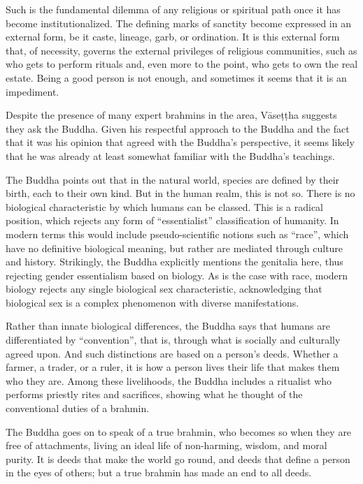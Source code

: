 \documentclass[12pt,openany]{book}%
\begin{document}
Such is the fundamental dilemma of any religious or spiritual path once it has become institutionalized. The defining marks of sanctity become expressed in an external form, be it caste, lineage, garb, or ordination. It is this external form that, of necessity, governs the external privileges of religious communities, such as who gets to perform rituals and, even more to the point, who gets to own the real estate. Being a good person is not enough, and sometimes it seems that it is an impediment.

Despite the presence of many expert brahmins in the area, \textsanskrit{Vāseṭṭha} suggests they ask the Buddha. Given his respectful approach to the Buddha and the fact that it was his opinion that agreed with the Buddha’s perspective, it seems likely that he was already at least somewhat familiar with the Buddha’s teachings.

The Buddha points out that in the natural world, species are defined by their birth, each to their own kind. But in the human realm, this is not so. There is no biological characteristic by which humans can be classed. This is a radical position, which rejects any form of “essentialist” classification of humanity. In modern terms this would include pseudo-scientific notions such as “race”, which have no definitive biological meaning, but rather are mediated through culture and history. Strikingly, the Buddha explicitly mentions the genitalia here, thus rejecting gender essentialism based on biology. As is the case with race, modern biology rejects any single biological sex characteristic, acknowledging that biological sex is a complex phenomenon with diverse manifestations.

Rather than innate biological differences, the Buddha says that humans are differentiated by “convention”, that is, through what is socially and culturally agreed upon. And such distinctions are based on a person’s deeds. Whether a farmer, a trader, or a ruler, it is how a person lives their life that makes them who they are. Among these livelihoods, the Buddha includes a ritualist who performs priestly rites and sacrifices, showing what he thought of the conventional duties of a brahmin.

The Buddha goes on to speak of a true brahmin, who becomes so when they are free of attachments, living an ideal life of non-harming, wisdom, and moral purity. It is deeds that make the world go round, and deeds that define a person in the eyes of others; but a true brahmin has made an end to all deeds.
\end{document}
